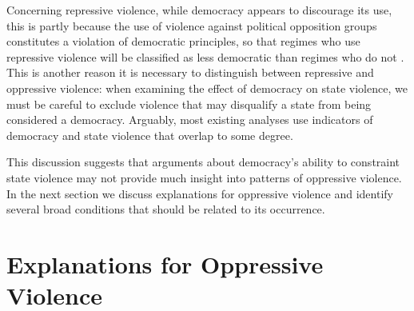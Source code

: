 \documentclass[11pt]{article}
\begin{document}
Concerning repressive violence, while democracy appears to discourage its use, this is partly because the use of violence against political opposition groups constitutes a violation of democratic principles, so that regimes who use repressive violence will be classified as less democratic than regimes who do not \citep{Hill2016}. This is another reason it is necessary to distinguish between repressive and oppressive violence: when examining the effect of democracy on state violence, we must be careful to exclude violence that may disqualify a state from being considered a democracy. Arguably, most existing analyses use indicators of democracy and state violence that overlap to some degree. 

This discussion suggests that arguments about democracy's ability to constraint state violence may not provide much insight into patterns of oppressive violence. In the next section we discuss explanations for oppressive violence and identify several broad conditions that should be related to its occurrence. 




\section*{Explanations for Oppressive Violence}
\end{document}
